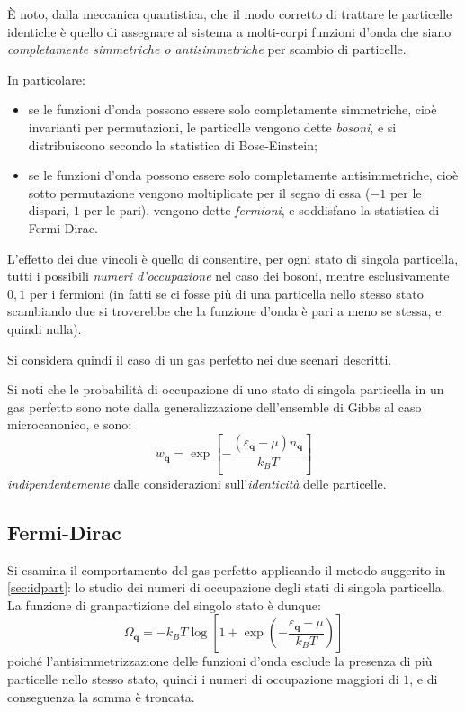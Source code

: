 \`E noto, dalla meccanica quantistica, che il modo corretto di trattare le particelle identiche è quello di assegnare al sistema a molti-corpi funzioni d'onda che siano \textit{completamente simmetriche o antisimmetriche} per scambio di particelle.

In particolare: 
\begin{itemize}
	\item se le funzioni d'onda possono essere solo completamente simmetriche, cioè invarianti per permutazioni, le particelle vengono dette \textit{bosoni}, e si distribuiscono secondo la statistica di Bose-Einstein;
	\item se le funzioni d'onda possono essere solo completamente antisimmetriche, cioè sotto permutazione vengono moltiplicate per il segno di essa ($-1$ per le dispari, $1$ per le pari), vengono dette \textit{fermioni}, e soddisfano la statistica di Fermi-Dirac.
\end{itemize}

L'effetto dei due vincoli è quello di consentire, per ogni stato di singola particella, tutti i possibili \textit{numeri d'occupazione} nel caso dei bosoni, mentre esclusivamente $0,1$ per i fermioni (in fatti se ci fosse più di una particella nello stesso stato scambiando due si troverebbe che la funzione d'onda è pari a meno se stessa, e quindi nulla).
\newline

Si considera quindi il caso di un gas perfetto nei due scenari descritti.

Si noti che le probabilità di occupazione di uno stato di singola particella in un gas perfetto sono note dalla generalizzazione dell'ensemble di Gibbs al caso microcanonico, e sono:
\begin{equation*}
w_{\textbf{q}} = \exp \left[-\frac{(\varepsilon_{\textbf{q}} - \mu) n_{\textbf{q}}}{k_B T}\right]
\end{equation*}
\textit{indipendentemente} dalle considerazioni sull'\textit{identicità} delle particelle.

\subsection{Fermi-Dirac}

Si esamina il comportamento del gas perfetto applicando il metodo suggerito in \cref{sec:idpart}: lo studio dei numeri di occupazione degli stati di singola particella.
La funzione di granpartizione del singolo stato è dunque:
\begin{equation*}
\Omega_{\textbf{q}} = - k_B T \log \left[1 + \exp \left(-\frac{\varepsilon_{\textbf{q}} - \mu}{k_B T}\right)\right]
\end{equation*}
poiché l'antisimmetrizzazione delle funzioni d'onda esclude la presenza di più particelle nello stesso stato, quindi i numeri di occupazione maggiori di $1$, e di conseguenza la somma è troncata.

